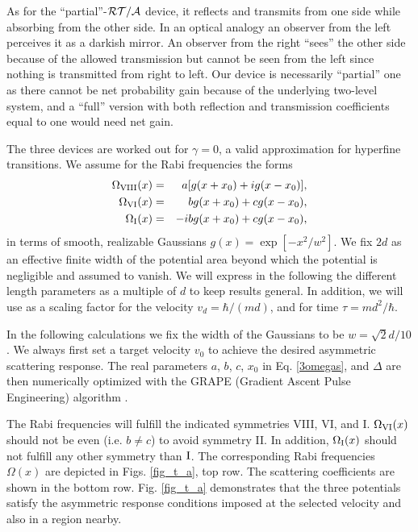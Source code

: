 As for the ``partial''-${\cal RT/A}$ device,  it reflects and transmits from one side while absorbing from the
other side. In an optical analogy an observer from the left perceives it as a darkish mirror.
An observer from the right ``sees'' the other side because of the allowed transmission
but cannot be seen from the left since  nothing is transmitted from right to left. Our device is necessarily ``partial'' one as
there cannot be  net probability gain because of the underlying two-level system, and a ``full'' version with both reflection and transmission coefficients equal to one
would need net gain.

The three devices are worked out for $\gamma=0$, a valid approximation for  hyperfine transitions. %
We assume  for the Rabi frequencies the forms
%
\begin{eqnarray}
	\Omega_{\rm VIII} (x) &=& a [g(x+x_0) + i  g(x-x_0)],
	\nonumber\\
	\Omega_{\rm VI} (x) &=&  b g(x+x_0) + c g(x-x_0),
	\nonumber\\
	\Omega_{\rm I} (x) &=&  - i b g(x+x_0) + c g(x-x_0),
	\label{3omegas}
\end{eqnarray}
%
in terms of smooth, realizable Gaussians $g(x) =  \exp[-{x^2}/{w^2}]$.
We fix $2 d$ as an effective finite width
of the potential area beyond which the potential is negligible and assumed to vanish. We will express in the following the different length parameters as a multiple of $d$ to keep results general.
In addition, we will use as a scaling factor for the velocity $v_{d} = {\hbar}/({m d})$, and for time $\tau={m d^2}/{\hbar}$.

In the following calculations we fix the width of the Gaussians to be $w= {\sqrt{2}}d/{10}$.
We always first set a target velocity $v_0$ to achieve the desired asymmetric scattering response.
The real parameters $a$, $b$, $c$, $x_0$ in Eq. \eqref{3omegas}, and  $\Delta$
are then numerically optimized with the GRAPE (Gradient Ascent Pulse Engineering) algorithm \cite{Khaneja2005,Wu2015}.

The Rabi frequencies will fulfill the indicated symmetries VIII, VI, and I. $\Omega_{\rm VI}(x)$ should not be even (i.e. $b \neq c$) to avoid symmetry II. In addition, $\Omega_{\rm I}(x)$ should not fulfill any other symmetry than ${\rm I}$.
The corresponding Rabi frequencies $\Omega(x)$ are  depicted in Figs. \ref{fig_t_a}, top row.
The scattering coefficients are shown in the bottom row. Fig. \ref{fig_t_a} demonstrates that the three potentials satisfy the asymmetric response conditions imposed
at the selected velocity and also in a region nearby.

